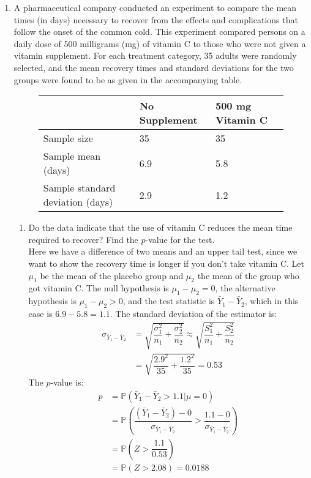\documentclass[12pt]{article}
\def\P{{\mathbb P}}
\begin{document}
\begin{enumerate}
\item A pharmaceutical company conducted an experiment to compare the mean times (in days) necessary to recover from the effects and complications that follow the onset of the common cold. This experiment compared persons on a daily dose of 500 milligrams (mg) of vitamin C to those who were not given a vitamin supplement. For each treatment category, 35 adults were randomly selected, and the mean recovery times and standard deviations for the two groups were found to be as given in the accompanying table.
\begin{figure}[H]
\centering
\begin{tabular}{l@{\hskip 2cm}l@{\hskip 2cm}l}
\toprule
& No Supplement & 500 mg Vitamin C \\
\midrule
Sample size & 35 & 35 \\
Sample mean (days) & 6.9 & 5.8 \\
Sample standard deviation (days) & 2.9 & 1.2 \\
\bottomrule
\end{tabular}
\end{figure} 
\begin{enumerate}
\item Do the data indicate that the use of vitamin C reduces the mean time required to recover? Find the $p$-value for the test.\\

Here we have a difference of two means and an upper tail test, since we want to show the recovery time is longer if you don't take vitamin C. Let $\mu_1$ be the mean of the placebo group and $\mu_2$ the mean of the group who got vitamin C. The null hypothesis is $\mu_1 - \mu_2 = 0$, the alternative hypothesis is $\mu_1 - \mu_2 > 0$, and the test statistic is $\bar{Y}_1 - \bar{Y}_2$, which in this case is $6.9 - 5.8 = 1.1$. The standard deviation of the estimator is:
\begin{align*}
\sigma_{\bar{Y}_1 - \bar{Y}_2} &= \sqrt{ \dfrac{\sigma^2_1}{n_1} + \dfrac{\sigma^2_2}{n_2} } \approx \sqrt{ \dfrac{S^2_1}{n_1} + \dfrac{S^2_2}{n_2} } \\
&= \sqrt{ \dfrac{2.9^2}{35} + \dfrac{1.2^2}{35} } = 0.53
\end{align*}
The $p$-value is:
\begin{align*}
p &= \P( \bar{Y}_1 - \bar{Y}_2 > 1.1 | \mu = 0 )\\
&= \P \left(\dfrac{ (\bar{Y}_1 - \bar{Y}_2) - 0 }{ \sigma_{\bar{Y}_1 - \bar{Y}_2} } > \dfrac{ 1.1 - 0 }{ \sigma_{\bar{Y}_1 - \bar{Y}_2}  }  \right) \\
&= \P \left( Z > \dfrac{ 1.1 }{ 0.53}  \right) \\
&= \P (Z > 2.08 ) = 0.0188
\end{align*}


\end{enumerate}
\end{enumerate}
\end{document}
